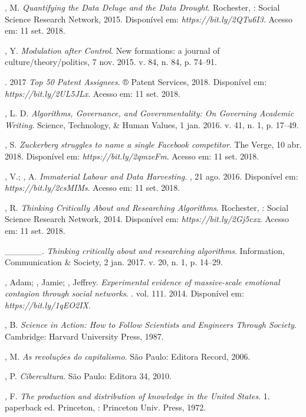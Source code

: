 , M. \emph{Quantifying the Data Deluge and the Data Drought}.
Rochester, : Social Science Research Network, 2015. Disponível em:
\emph{https://bit.ly/2QTu6I3}. Acesso em: 11 set. 2018.

, Y. \emph{Modulation after Control}. New formations: a journal of
culture/theory/politics, 7 nov. 2015. v. 84, n. 84, p. 74--91.

. 2017 \emph{Top 50  Patent Assignees}. ® Patent
Services, 2018. Disponível em: \emph{https://bit.ly/2UL5JLx}. Acesso em: 11 set. 2018.

, L. D. \emph{Algorithms, Governance, and Governmentality: On
Governing Academic Writing}. Science, Technology, \& Human
Values, 1 jan. 2016. v. 41, n. 1, p. 17--49.

, S. \emph{Zuckerberg struggles to name a single Facebook
competitor}. The Verge, 10 abr. 2018. Disponível em: \emph{https://bit.ly/2qmzeFm}. Acesso em: 11 set. 2018.

, V.; , A. \emph{Immaterial Labour and Data Harvesting}.
, 21 ago. 2016. Disponível em: \emph{https://bit.ly/2csMIMs}. Acesso em: 11 set. 2018.

, R. \emph{Thinking Critically About and Researching
Algorithms}. Rochester, : Social Science Research Network, 2014.
Disponível em: \emph{https://bit.ly/2Gj5cxz}. Acesso em: 11 set. 2018.

\_\_\_\_\_\_. \emph{Thinking critically about and researching
algorithms}. Information, Communication \& Society, 2 jan. 2017. v. 20,
n. 1, p. 14--29.

, Adam; , Jamie; , Jeffrey. \emph{Experimental evidence of massive-scale emotional contagion through social networks}. . vol.
111. 2014. Disponível em: \emph{https://bit.ly/1qEO2IX}.

, B. \emph{Science in Action: How to Follow Scientists and
Engineers Through Society}. Cambridge: Harvard University Press, 1987.

, M. \emph{As revoluções do capitalismo}. São Paulo: Editora
Record, 2006.

, P. \emph{Cibercultura}. São Paulo: Editora 34, 2010.

, F. \emph{The production and distribution of knowledge in the
United States}. 1. paperback ed. Princeton, : Princeton Univ.
Press, 1972.

